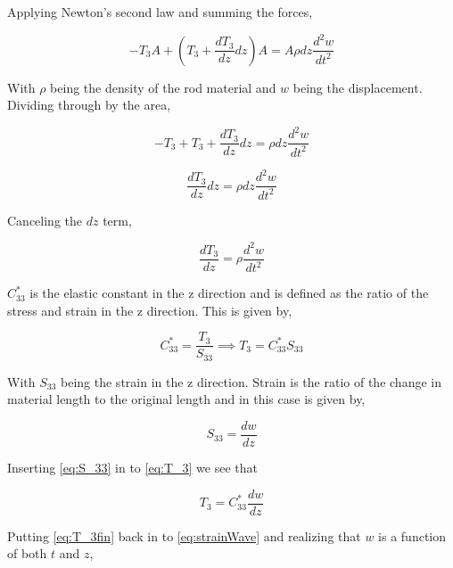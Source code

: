 Applying Newton's second law and summing the forces,

\begin{equation}
-T_3A + (T_3 + \frac{dT_3}{dz}dz)A = A\rho dz \frac{d^2w}{dt^2}
\end{equation}


With $\rho$ being the density of the rod material and $w$ being the displacement. Dividing through by the area,

\begin{equation}
-T_3 + T_3 + \frac{dT_3}{dz}dz = \rho dz \frac{d^2w}{dt^2}
\end{equation}

\begin{equation}
\frac{dT_3}{dz}dz = \rho dz \frac{d^2w}{dt^2}
\end{equation}

Canceling the $dz$ term,

\begin{equation}
\frac{dT_3}{dz} = \rho \frac{d^2w}{dt^2}
\label{eq:strainWave}
\end{equation}

$C^*_{33}$ is the elastic constant in the z direction and is defined as the ratio of the stress and strain in the z direction. This is given by,

\begin{equation}
C^*_{33} = \frac{T_3}{S_{33}} \implies T_3 = C^*_{33}S_{33}
\label{eq:T_3}
\end{equation}


With $S_{33}$ being the strain in the z direction. Strain is the ratio of the change in material length to the original length and in this case is given by,

\begin{equation}
S_{33} = \frac{dw}{dz}
\label{eq:S_33}
\end{equation}

Inserting \ref{eq:S_33} in to \ref{eq:T_3} we see that

\begin{equation}
T_3 = C^*_{33}\frac{dw}{dz}
\label{eq:T_3fin}
\end{equation}

Putting \ref{eq:T_3fin} back in to \ref{eq:strainWave} and realizing that $w$ is a function of both $t$ and $z$,

